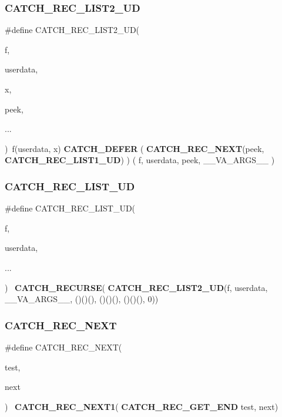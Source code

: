 \subsubsection{CATCH\_REC\_LIST2\_UD}
{\footnotesize\ttfamily \#define C\+A\+T\+C\+H\+\_\+\+R\+E\+C\+\_\+\+L\+I\+S\+T2\+\_\+\+UD(\begin{DoxyParamCaption}\item[{}]{f,  }\item[{}]{userdata,  }\item[{}]{x,  }\item[{}]{peek,  }\item[{}]{... }\end{DoxyParamCaption})~f(userdata, x) \textbf{ C\+A\+T\+C\+H\+\_\+\+D\+E\+F\+ER} ( \textbf{ C\+A\+T\+C\+H\+\_\+\+R\+E\+C\+\_\+\+N\+E\+XT}(peek, \textbf{ C\+A\+T\+C\+H\+\_\+\+R\+E\+C\+\_\+\+L\+I\+S\+T1\+\_\+\+UD}) ) ( f, userdata, peek, \+\_\+\+\_\+\+V\+A\+\_\+\+A\+R\+G\+S\+\_\+\+\_\+ )}

\mbox{\label{catch_8hpp_a8e404d42a6d0402698c1d4d16e831d28}} 
\subsubsection{CATCH\_REC\_LIST\_UD}
{\footnotesize\ttfamily \#define C\+A\+T\+C\+H\+\_\+\+R\+E\+C\+\_\+\+L\+I\+S\+T\+\_\+\+UD(\begin{DoxyParamCaption}\item[{}]{f,  }\item[{}]{userdata,  }\item[{}]{... }\end{DoxyParamCaption})~\textbf{ C\+A\+T\+C\+H\+\_\+\+R\+E\+C\+U\+R\+SE}(\textbf{ C\+A\+T\+C\+H\+\_\+\+R\+E\+C\+\_\+\+L\+I\+S\+T2\+\_\+\+UD}(f, userdata, \+\_\+\+\_\+\+V\+A\+\_\+\+A\+R\+G\+S\+\_\+\+\_\+, ()()(), ()()(), ()()(), 0))}

\mbox{\label{catch_8hpp_abaddf93f755cea9e20aee254aa566adf}} 
\subsubsection{CATCH\_REC\_NEXT}
{\footnotesize\ttfamily \#define C\+A\+T\+C\+H\+\_\+\+R\+E\+C\+\_\+\+N\+E\+XT(\begin{DoxyParamCaption}\item[{}]{test,  }\item[{}]{next }\end{DoxyParamCaption})~\textbf{ C\+A\+T\+C\+H\+\_\+\+R\+E\+C\+\_\+\+N\+E\+X\+T1}(\textbf{ C\+A\+T\+C\+H\+\_\+\+R\+E\+C\+\_\+\+G\+E\+T\+\_\+\+E\+ND} test, next)}

